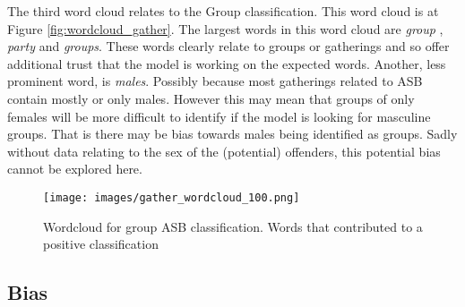 The third word cloud relates to the Group classification. This word cloud is at Figure \ref{fig:wordcloud_gather}. The largest words in this word cloud are \emph{group} , \emph{party} and \emph{groups}. These words clearly relate to groups or gatherings and so offer additional trust that the model is working on the expected words. Another, less prominent word, is \emph{males}. Possibly because most gatherings related to ASB contain mostly or only males. However this may mean that groups of only females will be more difficult to identify if the model is looking for masculine groups. That is there may be bias towards males being identified as groups. Sadly without data relating to the sex of the (potential) offenders, this potential bias cannot be explored here. 


\begin{figure}[h]
    \texttt{[image: images/gather\_wordcloud\_100.png]}
    \caption{{Wordcloud for group ASB classification.} Words that contributed to a positive classification}
    \label{fig: wordcloud_gather}
\end{figure}
   


\subsection{Bias}



